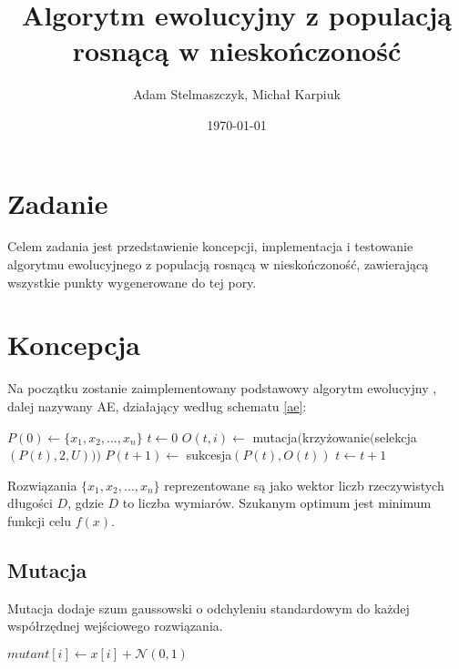 \documentclass[12pt, a4paper]{article}
\title{\textbf{Algorytm ewolucyjny z populacją rosnącą w nieskończoność}}
\author{Adam Stelmaszczyk, Michał Karpiuk}
\date{\today}
\begin{document}
\maketitle

\section{Zadanie}

Celem zadania jest przedstawienie koncepcji, implementacja i testowanie algorytmu ewolucyjnego z populacją rosnącą
w nieskończoność, zawierającą wszystkie punkty wygenerowane do tej pory.

\section{Koncepcja}

Na początku zostanie zaimplementowany podstawowy algorytm ewolucyjny \cite{jarabas}, dalej nazywany AE, 
działający według schematu \ref{ae}:

\begin{algorithm}[!htb]
\label{ae}
\begin{algorithmic}[1]
  \State $P(0) \gets \{x_1, x_2, \ldots, x_n\}$
  \State $t \gets 0$
      \State $O(t,i) \gets$ mutacja$($krzy{\.z}owanie$($selekcja$(P(t), 2, U)))$
    \EndFor
    \State $P(t+1) \gets$ sukcesja$(P(t),O(t))$
    \State $t \gets t+1$
  \EndWhile
\EndFunction
\end{algorithmic}
\end{algorithm}

Rozwiązania $\{x_1, x_2, \ldots, x_n\}$ reprezentowane są jako wektor liczb rzeczywistych długości $D$,
gdzie $D$ to liczba wymiarów. Szukanym optimum jest minimum funkcji celu $f(x)$.

\subsection{Mutacja}

Mutacja dodaje szum gaussowski o odchyleniu standardowym do każdej współrzędnej wejściowego rozwiązania.

\begin{algorithm}[!htb]
\begin{algorithmic}[1]
    \State $mutant[i] \gets x[i] + \mathcal{N}(0, 1)$
  \EndFor
\EndFunction
\end{algorithmic}
\end{algorithm}
\end{document}
